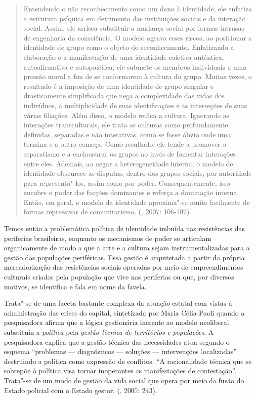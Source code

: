 \begin{quote}
Entendendo o não reconhecimento como um dano à identidade, ele enfatiza
a estrutura psíquica em detrimento das instituições sociais e da
interação social. Assim, ele arrisca substituir a mudança social por
formas intrusas de engenharia da consciência. O modelo agrava esses
riscos, ao posicionar a identidade de grupo como o objeto do
reconhecimento. Enfatizando a elaboração e a manifestação de uma
identidade coletiva autêntica, autoafirmativa e autopoiética, ele
submete os membros individuais a uma pressão moral a fim de se
conformarem à cultura do grupo. Muitas vezes, o resultado é a imposição
de uma identidade de grupo singular e drasticamente simplificada que
nega a complexidade das vidas dos indivíduos, a multiplicidade de suas
identificações e as interseções de suas várias filiações. Além disso, o
modelo reifica a cultura. Ignorando as interações transculturais, ele
trata as culturas como profundamente definidas, separadas e não
interativas, como se fosse óbvio onde uma termina e a outra começa. Como
resultado, ele tende a promover o separatismo e a enclausurar os grupos
ao invés de fomentar interações entre eles. Ademais, ao negar a
heterogeneidade interna, o modelo de identidade obscurece as disputas,
dentro dos grupos sociais, por autoridade para representá"-los, assim
como por poder. Consequentemente, isso encobre o poder das facções
dominantes e reforça a dominação interna. Então, em geral, o modelo da
identidade aproxima"-se muito facilmente de formas repressivas de
comunitarismo. (, 2007: 106-107).
\end{quote}

Temos então a problemática política de identidade imbuída nas
resistências das periferias brasileiras, enquanto os mecanismos de poder
se articulam organicamente de modo a que a arte e a cultura sejam
instrumentalizadas para a gestão das populações periféricas. Essa gestão
é arquitetada a partir da própria mercadorização das resistências
sociais operadas por meio de empreendimentos culturais criados pela
população que vive nas periferias ou que, por diversos motivos, se
identifica e fala em nome da favela.

Trata"-se de uma faceta bastante complexa da atuação estatal com vistas à
administração das crises do capital, sintetizada por Maria Célia Paoli
quando a pesquisadora afirma que a lógica gestionária inerente ao modelo
neoliberal substituiu a \emph{política} pela \emph{gestão técnica de
territórios e populações}. A pesquisadora explica que a gestão técnica
das necessidades atua segundo o esquema ``problemas --- diagnósticos ---
soluções --- intervenções localizadas'' destruindo a política como
expressão de conflitos. ``A racionalidade técnica que se sobrepõe à
política visa tornar inoperantes as manifestações de contestação''.
Trata"-se de um modo de gestão da vida social que opera por meio da fusão
do Estado policial com o Estado gestor. (, 2007: 243).

